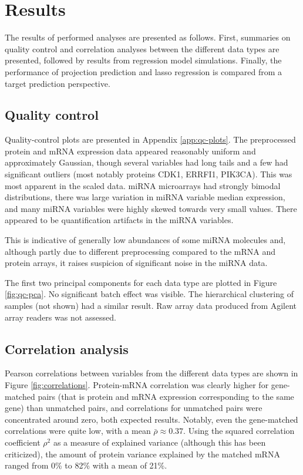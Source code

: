 
\section{Results}

The results of performed analyses are presented as follows. First,
summaries on quality control and correlation analyses between the different
data types are presented, followed by results from regression model simulations.
Finally, the performance of projection prediction and lasso regression
is compared from a target prediction perspective.




\subsection*{Quality control}

Quality-control plots are presented in Appendix \ref{app:qc-plots}. 
The preprocessed protein and mRNA expression data appeared reasonably uniform
and approximately Gaussian, though several variables had long tails
and a few had significant outliers (most notably proteins CDK1, ERRFI1, PIK3CA).
This was most apparent in the scaled data. miRNA microarrays had strongly bimodal
distributions, there was large variation in miRNA variable median expression,
and many miRNA variables were highly skewed towards very small values.
There appeared to be quantification artifacts in the miRNA variables.

This is indicative of generally low abundances of some miRNA molecules
and, although partly due to different preprocessing compared to the mRNA and
protein arrays, it raises suspicion of significant noise in the miRNA data.

The first two principal components for each data type are plotted in Figure
\ref{fig:qc-pca}. No significant batch effect was visible. The hierarchical
clustering of samples (not shown) had a similar result. Raw array data
produced from Agilent array readers was not assessed.




\subsection*{Correlation analysis}

Pearson correlations between variables from the different data types are shown in Figure
\ref{fig:correlations}. Protein-mRNA correlation was clearly higher for gene-matched pairs
(that is protein and mRNA expression corresponding to the same gene) than unmatched pairs,
and correlations for unmatched pairs were concentrated around zero, both expected
results. Notably, even the gene-matched correlations were quite low, with a
mean $\bar{\rho} \approx 0.37$. Using the squared correlation coefficient $\rho^2$ as a
measure of explained variance (although this has been criticized), the amount
of protein variance explained by the matched mRNA ranged from 0\% to 82\% with a mean of
21\%.

